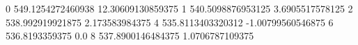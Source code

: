 0 549.1254272460938 12.30609130859375
1 540.5098876953125 3.6905517578125
2 538.992919921875 2.173583984375
4 535.8113403320312 -1.00799560546875
6 536.8193359375 0.0
8 537.8900146484375 1.0706787109375
